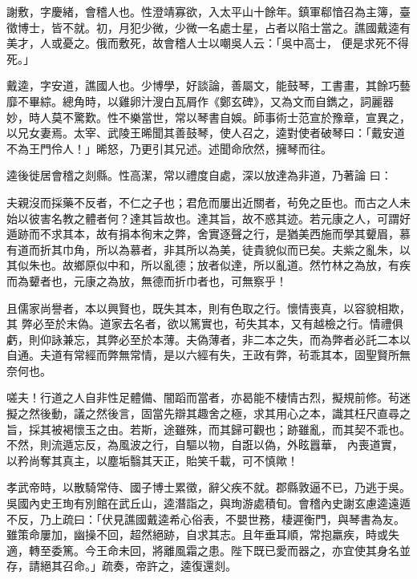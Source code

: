 \begin{pinyinscope}
 謝敷，字慶緒，會稽人也。性澄靖寡欲，入太平山十餘年。鎮軍郗愔召為主簿，臺徵博士，皆不就。初，月犯少微，少微一名處士星，占者以陷士當之。譙國戴逵有美才，人或憂之。俄而敷死，故會稽人士以嘲吳人云：「吳中高士，
 便是求死不得死。」



 戴逵，字安道，譙國人也。少博學，好談論，善屬文，能鼓琴，工書畫，其餘巧藝靡不畢綜。總角時，以雞卵汁溲白瓦屑作《鄭玄碑》，又為文而自鐫之，詞麗器妙，時人莫不驚歎。性不樂當世，常以琴書自娛。師事術士范宣於豫章，宣異之，以兄女妻焉。太宰、武陵王晞聞其善鼓琴，使人召之，逵對使者破琴曰：「戴安道不為王門伶人！」晞怒，乃更引其兄述。述聞命欣然，擁琴而往。



 逵後徙居會稽之剡縣。性高潔，常以禮度自處，深以放達為非道，乃著論
 曰：



 夫親沒而採藥不反者，不仁之子也；君危而屢出近關者，茍免之臣也。而古之人未始以彼害名教之體者何？達其旨故也。達其旨，故不惑其迹。若元康之人，可謂好遁跡而不求其本，故有捐本徇末之弊，舍實逐聲之行，是猶美西施而學其顰眉，慕有道而折其巾角，所以為慕者，非其所以為美，徒貴貌似而已矣。夫紫之亂朱，以其似朱也。故鄉原似中和，所以亂德；放者似達，所以亂道。然竹林之為放，有疾而為顰者也，元康之為放，無德而折巾者也，可無察乎！



 且儒家尚譽者，本以興賢也，既失其本，則有色取之行。懷情喪真，以容貌相欺，其
 弊必至於末偽。道家去名者，欲以篤實也，茍失其本，又有越檢之行。情禮俱虧，則仰詠兼忘，其弊必至於本薄。夫偽薄者，非二本之失，而為弊者必託二本以自通。夫道有常經而弊無常情，是以六經有失，王政有弊，茍乖其本，固聖賢所無奈何也。



 嗟夫！行道之人自非性足體備、闇蹈而當者，亦曷能不棲情古烈，擬規前修。茍迷擬之然後動，議之然後言，固當先辯其趣舍之極，求其用心之本，識其枉尺直尋之旨，採其被褐懷玉之由。若斯，途雖殊，而其歸可觀也；跡雖亂，而其契不乖也。不然，則流遁忘反，為風波之行，自驅以物，自誑以偽，外眩囂華，
 內喪道實，以矜尚奪其真主，以塵垢翳其天正，貽笑千載，可不慎歟！



 孝武帝時，以散騎常侍、國子博士累徵，辭父疾不就。郡縣敦逼不已，乃逃于吳。吳國內史王珣有別館在武丘山，逵潛詣之，與珣游處積旬。會稽內史謝玄慮逵遠遁不反，乃上疏曰：「伏見譙國戴逵希心俗表，不嬰世務，棲遲衡門，與琴書為友。雖策命屢加，幽操不回，超然絕跡，自求其志。且年垂耳順，常抱羸疾，時或失適，轉至委篤。今王命未回，將離風霜之患。陛下既已愛而器之，亦宜使其身名並存，請絕其召命。」疏奏，帝許之，逵復還剡。




\end{pinyinscope}
